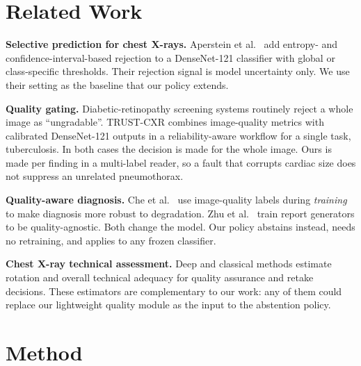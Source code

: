 \documentclass[conference]{IEEEtran}
\begin{document}
\section{Related Work}

\textbf{Selective prediction for chest X-rays.} Aperstein et
al.~\cite{aperstein2025rejection} add entropy- and confidence-interval-based
rejection to a DenseNet-121 classifier with global or class-specific
thresholds. Their rejection signal is model uncertainty only. We use their
setting as the baseline that our policy extends.

\textbf{Quality gating.} Diabetic-retinopathy screening systems routinely
reject a whole image as ``ungradable''. TRUST-CXR \cite{salam2026trustcxr}
combines image-quality metrics with calibrated DenseNet-121 outputs in a
reliability-aware workflow for a single task, tuberculosis. In both cases the
decision is made for the whole image. Ours is made per finding in a
multi-label reader, so a fault that corrupts cardiac size does not suppress an
unrelated pneumothorax.

\textbf{Quality-aware diagnosis.} Che et al.~\cite{che2023qualityaware} use
image-quality labels during \emph{training} to make diagnosis more robust to
degradation. Zhu et al.~\cite{zhu2026lowquality} train report generators to be
quality-agnostic. Both change the model. Our policy abstains instead, needs no
retraining, and applies to any frozen classifier.

\textbf{Chest X-ray technical assessment.} Deep and classical methods estimate
rotation \cite{sun2024rotation} and overall technical adequacy
\cite{meng2022cxrquality} for quality assurance and retake decisions. These
estimators are complementary to our work: any of them could replace our
lightweight quality module as the input to the abstention policy.

\section{Method}
\end{document}
